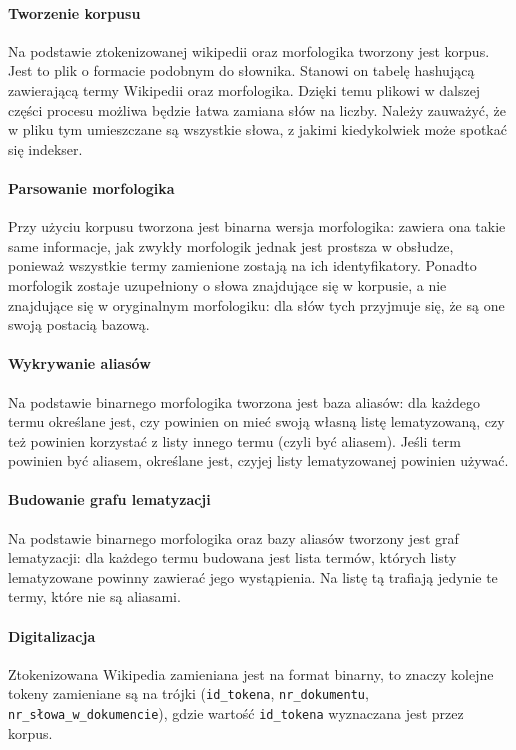 \documentclass[a4paper,12pt]{article}
\begin{document}
\paragraph{Tworzenie korpusu} Na podstawie ztokenizowanej wikipedii oraz
morfologika tworzony jest korpus. Jest to plik o formacie podobnym do
słownika. Stanowi on tabelę hashującą zawierającą termy Wikipedii oraz
morfologika. Dzięki temu plikowi w dalszej części procesu możliwa będzie
łatwa zamiana słów na liczby. Należy zauważyć, że w pliku tym umieszczane są
wszystkie słowa, z jakimi kiedykolwiek może spotkać się indekser.

\paragraph{Parsowanie morfologika} Przy użyciu korpusu tworzona jest binarna
wersja morfologika: zawiera ona takie same informacje, jak zwykły morfologik
jednak jest prostsza w obsłudze, ponieważ wszystkie termy zamienione zostają
na ich identyfikatory. Ponadto morfologik zostaje uzupełniony o słowa
znajdujące się w korpusie, a nie znajdujące się w oryginalnym morfologiku:
dla słów tych przyjmuje się, że są one swoją postacią bazową.

\paragraph{Wykrywanie aliasów} Na podstawie binarnego morfologika tworzona
jest baza aliasów: dla każdego termu określane jest, czy powinien on mieć
swoją własną listę lematyzowaną, czy też powinien korzystać z listy innego
termu (czyli być aliasem). Jeśli term powinien być aliasem, określane jest,
czyjej listy lematyzowanej powinien używać.

\paragraph{Budowanie grafu lematyzacji} Na podstawie binarnego morfologika
oraz bazy aliasów tworzony jest graf lematyzacji: dla każdego termu budowana
jest lista termów, których listy lematyzowane powinny zawierać jego
wystąpienia. Na listę tą trafiają jedynie te termy, które nie są aliasami.

\paragraph{Digitalizacja} Ztokenizowana Wikipedia zamieniana jest na format
binarny, to znaczy kolejne tokeny zamieniane są na trójki (\texttt{id\_tokena},
\texttt{nr\_dokumentu}, \texttt{nr\_słowa\_w\_dokumencie}), gdzie wartość
\texttt{id\_tokena} wyznaczana jest przez korpus.
\end{document}
